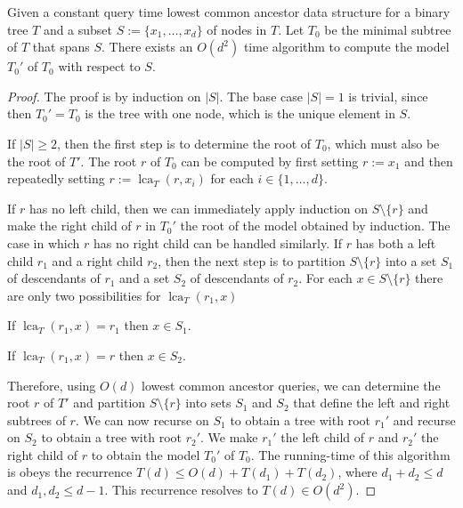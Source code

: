 \documentclass{patmorin}
\DeclareMathOperator{\lca}{lca}
\begin{document}

\begin{lem}\label{reconstruction}
  Given a constant query time lowest common ancestor data structure for a binary tree $T$ and a subset $S:=\{x_1,\ldots,x_d\}$ of nodes in $T$. Let $T_0$ be the minimal subtree of $T$ that spans $S$. There exists an $O(d^2)$ time algorithm to compute the model $T_0'$ of $T_0$ with respect to $S$.
\end{lem}

\begin{proof}
  The proof is by induction on $|S|$.  The base case $|S|=1$ is trivial, since then $T_0'=T_0$ is the tree with one node, which is the unique element in $S$.

  If $|S|\ge 2$, then the first step is to determine the root of $T_0$, which must also be the root of $T'$.  The root $r$ of $T_0$ can be computed by first setting $r:=x_1$ and then repeatedly setting $r:=\lca_{T}(r,x_i)$ for each $i\in\{1,\ldots,d\}$.

  If $r$ has no left child, then we can immediately apply induction on $S\setminus\{r\}$ and make the right child of $r$ in $T_0'$ the root of the model obtained by induction.  The case in which $r$ has no right child can be handled similarly. If $r$ has both a left child $r_1$ and a right child $r_2$, then the next step is to partition $S\setminus\{r\}$ into a set $S_1$ of descendants of $r_1$ and a set $S_2$ of descendants of $r_2$.   For each $x\in S\setminus\{r\}$ there are only two possibilities for $\lca_{T}(r_1,x)$
  \begin{compactenum}
    \item If $\lca_{T}(r_1,x)=r_1$ then $x\in S_1$.
    \item If $\lca_{T}(r_1,x)=r$ then $x\in S_2$.
  \end{compactenum}
  Therefore, using $O(d)$ lowest common ancestor queries, we can determine the root $r$ of $T'$ and partition $S\setminus\{r\}$ into sets $S_1$ and $S_2$ that define the left and right subtrees of $r$.  We can now recurse on $S_1$ to obtain a tree with root $r_1'$ and recurse on $S_2$ to obtain a tree with root $r_2'$.  We make $r_1'$ the left child of $r$ and $r_2'$ the right child of $r$ to obtain the model $T_0'$ of $T_0$.  The running-time of this  algorithm is obeys the recurrence $T(d)\le O(d)+T(d_1) + T(d_2)$, where $d_1 + d_2 \leq d$ and $d_1, d_2 \leq d-1$.  This recurrence resolves to $T(d)\in O(d^2)$.
\end{proof}
\end{document}
